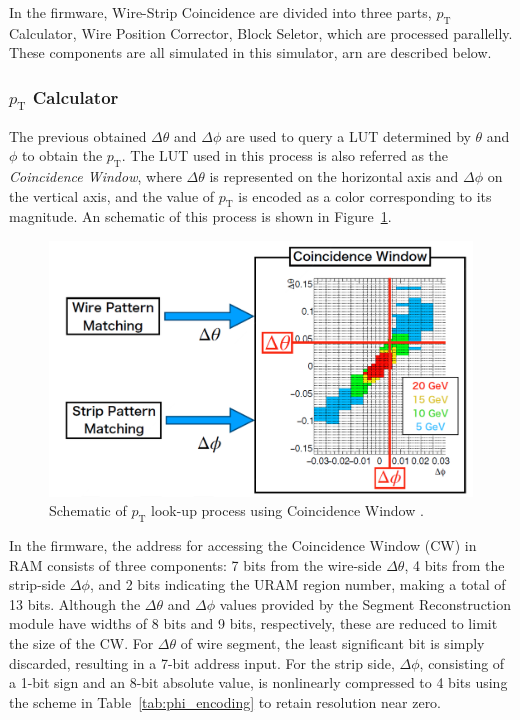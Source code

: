In the firmware, Wire-Strip Coincidence are divided into three parts, $p_{\mathrm{T}}$ Calculator, Wire Position Corrector, Block Seletor, which are processed parallelly. These components are all simulated in this simulator, arn are described below.

\subsubsection{$p_{\mathrm{T}}$ Calculator}

The previous obtained $\Delta\theta$ and $\Delta\phi$ are used to query a LUT determined by $\theta$ and $\phi$  to obtain the $p_{\mathrm{T}}$. The LUT used in this process is also referred as the \textit{Coincidence Window}, where $\Delta\theta$ is represented on the horizontal axis and $\Delta\phi$ on the vertical axis, and the value of $p_{\mathrm{T}}$ is encoded as a color corresponding to its magnitude. An schematic of this process is shown in Figure~\ref{fig:coin_window}.

\begin{figure}[htbp]
  \centering
  \includegraphics[width=1.0\textwidth]{figs/chapter5/coin_window.png}
  \caption{Schematic of $p_\mathrm{T}$ look-up process using Coincidence Window \cite{EndcapSLPDR}.}
  \label{fig:coin_window}
\end{figure}

In the firmware, the address for accessing the Coincidence Window (CW) in RAM consists of three components: 7 bits from the wire-side \(\Delta\theta\), 4 bits from the strip-side \(\Delta\phi\), and 2 bits indicating the URAM region number, making a total of 13 bits. Although the \(\Delta\theta\) and \(\Delta\phi\) values provided by the Segment Reconstruction module have widths of 8 bits and 9 bits, respectively, these are reduced to limit the size of the CW. For \(\Delta\theta\) of wire segment, the least significant bit is simply discarded, resulting in a 7-bit address input. For the strip side, \(\Delta\phi\), consisting of a 1-bit sign and an 8-bit absolute value, is nonlinearly compressed to 4 bits using the scheme in Table~\ref{tab:phi_encoding} to retain resolution near zero.

